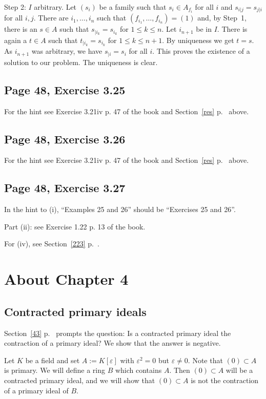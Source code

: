 \documentclass[parskip=half,fontsize=12pt]{scrartcl}%
\begin{document}
Step 2: $I$ arbitrary. Let $(s_i)$ be a family such that $s_i\in A_{f_i}$ for all $i$ and $s_{i|j}=s_{j|i}$ for all $i,j$. There are $i_1,\dots,i_n$ such that $(f_{i_1},\dots,f_{i_n})=(1)$ and, by Step~1, there is an $s\in A$ such that $s_{|i_k}=s_{i_k}$ for $1\le k\le n$. Let $i_{n+1}$ be in $I$. There is again a $t\in A$ such that $t_{|i_k}=s_{i_k}$ for $1\le k\le n+1$. By uniqueness we get $t=s$. As $i_{n+1}$ was arbitrary, we have $s_{|i}=s_i$ for all $i$. This proves the existence of a solution to our problem. The uniqueness is clear.

\subsection{Page 48, Exercise 3.25}%

For the hint see Exercise 3.21iv p. 47 of the book and Section~\ref{res} p.~\pageref{res} above.

\subsection{Page 48, Exercise 3.26}%

For the hint see Exercise 3.21iv p. 47 of the book and Section~\ref{res} p.~\pageref{res} above.

\subsection{Page 48, Exercise 3.27}%

In the hint to (i), ``Examples 25 and 26'' should be ``Exercises 25 and 26''. 

Part (ii): see Exercise 1.22 p. 13 of the book. 

For (iv), see Section~\ref{223} p.~\pageref{223}.

\section{About Chapter 4}%

\subsection{Contracted primary ideals}\label{cpi}%

Section~\ref{43} p.~\pageref{43} prompts the question: Is a contracted primary ideal the contraction of a primary ideal? We show that the answer is negative.

Let $K$ be a field and set $A:=K[\varepsilon]$ with $\varepsilon^2=0$ but $\varepsilon\ne0$. Note that $(0)\subset A$ is primary. We will define a ring $B$ which contains $A$. Then $(0)\subset A$ will be a contracted primary ideal, and we will show that $(0)\subset A$ is not the contraction of a primary ideal of $B$. 
\end{document}
